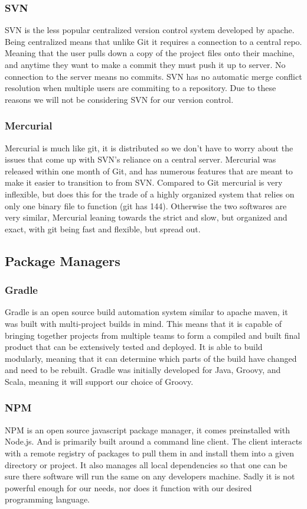 \documentclass[onecolumn, draftclsnofoot,10pt, compsoc]{IEEEtran}
\begin{document}
\subsubsection{SVN}
    SVN is the less popular centralized version control system developed by apache. Being centralized means that unlike Git it requires a connection to a central repo. Meaning that the user pulls down a copy of the project files onto their machine, and anytime they want to make a commit they must push it up to server. No connection to the server means no commits. SVN has no automatic merge conflict resolution when multiple users are commiting to a repository. Due to these reasons we will not be considering SVN for our version control.
\subsubsection{Mercurial}
    Mercurial is much like git, it is distributed so we don't have to worry about the issues that come up with SVN's reliance on a central server. Mercurial was released within one month of Git, and has numerous features that are meant to make it easier to transition to from SVN. Compared to Git mercurial is very inflexible, but does this for the trade of a highly organized system that relies on only one binary file to function (git has 144). Otherwise the two softwares are very similar, Mercurial leaning towards the strict and slow, but organized and exact, with git being fast and flexible, but spread out.
\subsection{Package Managers}
\subsubsection{Gradle}
Gradle is an open source build automation system similar to apache maven, it was built with multi-project builds in mind. This means that it is capable of bringing together projects from multiple teams to form a compiled and built final product that can be extensively tested and deployed. It is able to build modularly, meaning that it can determine which parts of the build have changed and need to be rebuilt. Gradle was initially developed for Java, Groovy, and Scala, meaning it will support our choice of Groovy.
\subsubsection{NPM}
NPM is an open source javascript package manager, it comes preinstalled with Node.js. And is primarily built around a command line client. The client interacts with a remote registry of packages to pull them in and install them into a given directory or project. It also manages all local dependencies so that one can be sure there software will run the same on any developers machine. Sadly it is not powerful enough for our needs, nor does it function with our desired programming language.
\end{document}
